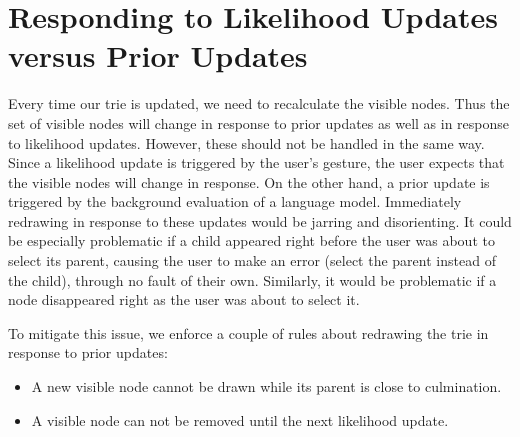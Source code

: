 \section{Responding to Likelihood Updates versus Prior Updates}

Every time our trie is updated, we need to recalculate the visible nodes.
Thus the set of visible nodes will change in response to prior updates as well
as in response to likelihood updates. However, these should not be handled in the same way.
Since a likelihood update is triggered by the user's gesture, the user expects that the visible nodes
will change in response. On the other hand, a prior update is triggered by the background evaluation of a language model.
Immediately redrawing in response to these updates would be jarring and disorienting.
It could be especially problematic if a child appeared right before the user was about to select its parent, causing
the user to make an error (select the parent instead of the child), through no fault of their own.
Similarly, it would be problematic if a node disappeared right as the user was about to select it.

To mitigate this issue, we enforce a couple of rules about redrawing the trie in response to prior updates:
\begin{itemize}[topsep=2pt]
  \item A new visible node cannot be drawn while its parent is close to culmination.
  \item A visible node can not be removed until the next likelihood update.
\end{itemize}


